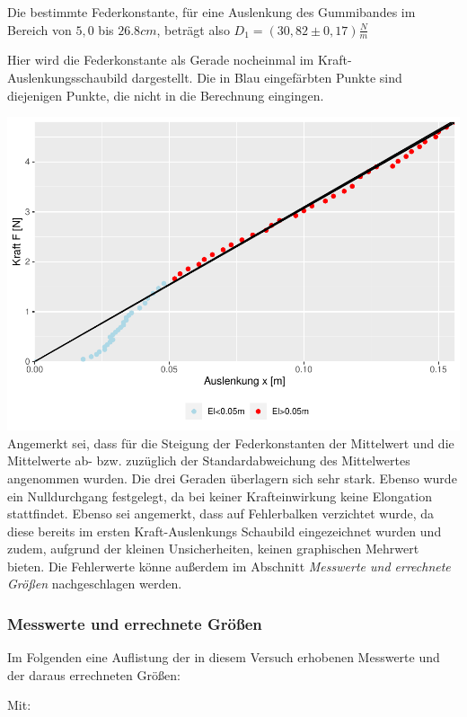 \documentclass[
  9pt,
]{article}
\begin{document}
Die bestimmte Federkonstante, für eine Auslenkung des Gummibandes im
Bereich von \(5,0\) bis \(26.8cm\), beträgt also
\(D_1=(30,82\pm 0,17)\frac{N}{m}\)

\newpage

Hier wird die Federkonstante als Gerade nocheinmal im
Kraft-Auslenkungsschaubild dargestellt. Die in Blau eingefärbten Punkte
sind diejenigen Punkte, die nicht in die Berechnung eingingen.

\includegraphics{DehnbareStoffe_files/figure-latex/unnamed-chunk-11-1.pdf}
Angemerkt sei, dass für die Steigung der Federkonstanten der Mittelwert
und die Mittelwerte ab- bzw. zuzüglich der Standardabweichung des
Mittelwertes angenommen wurden. Die drei Geraden überlagern sich sehr
stark. Ebenso wurde ein Nulldurchgang festgelegt, da bei keiner
Krafteinwirkung keine Elongation stattfindet. Ebenso sei angemerkt, dass
auf Fehlerbalken verzichtet wurde, da diese bereits im ersten
Kraft-Auslenkungs Schaubild eingezeichnet wurden und zudem, aufgrund der
kleinen Unsicherheiten, keinen graphischen Mehrwert bieten. Die
Fehlerwerte könne außerdem im Abschnitt
\textit{Messwerte und errechnete Größen} nachgeschlagen werden.

\hypertarget{messwerte-und-errechnete-gruxf6uxdfen}{%
\subsubsection{Messwerte und errechnete
Größen}\label{messwerte-und-errechnete-gruxf6uxdfen}}

Im Folgenden eine Auflistung der in diesem Versuch erhobenen Messwerte
und der daraus errechneten Größen:

Mit:
\end{document}
